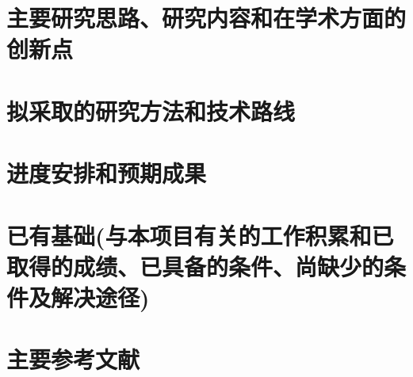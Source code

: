 \documentclass[a4paper,12pt]{CSUResearchProposal}
\begin{document}
\section{主要研究思路、研究内容和在学术方面的创新点}
\label{sec:contents_research}

\newpage

\section{拟采取的研究方法和技术路线}
\label{sec:method}


\newpage

\section{进度安排和预期成果}

\newpage

\section{已有基础{\kaishu (与本项目有关的工作积累和已取得的成绩、已具备的条件、尚缺少的条件及解决途径)}}


\newpage

\section{主要参考文献}
\vspace*{-3ex}


\end{document}
